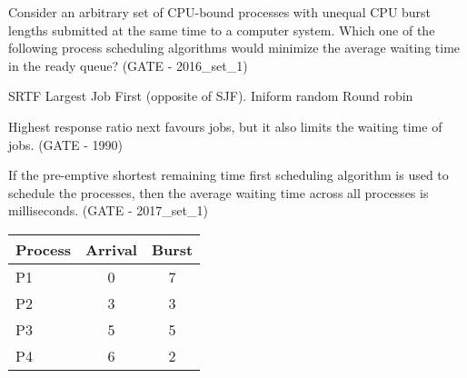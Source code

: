 

\begin{questyle}

  \question  Consider an arbitrary set of CPU-bound processes with unequal CPU burst lengths submitted at
            the same time to a computer system. Which one of the following process scheduling algorithms would
            minimize the average waiting time in the ready queue? (GATE - 2016\_set\_1)

  \begin{choices}
    \CorrectChoice SRTF
    \choice Largest Job First (opposite of SJF).
    \choice Iniform random
    \choice Round robin
  \end{choices}

  \end{questyle}





\begin{questyle}

  \question Highest response ratio next favours   jobs, but it also limits the
            waiting time of  jobs. (GATE - 1990)

  \end{questyle}





\begin{questyle}

  \question If the pre-emptive shortest remaining time first scheduling algorithm is used to schedule the processes, then
            the average waiting time across all processes is \fillin[3] milliseconds. (GATE - 2017\_set\_1)

  \begin{myTableStyle}
    \begin{center}
    \begin{tabular}{ |l|c|c| } \hline
        Process &   Arrival & Burst    \\ \hline
        P1      &   0       & 7         \\ \hline
        P2      &   3       & 3         \\ \hline
        P3      &   5       & 5         \\ \hline
        P4      &   6       & 2         \\ \hline

    \end{tabular}
    \end{center}
  \end{myTableStyle}

  \end{questyle}



